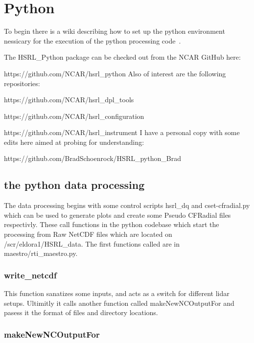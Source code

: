 
\chapter{Python}
\label{SECTION-python}

To begin there is a wiki describing how to set up the python environment nessicary for the execution of the python processing code~\cite{PythonEnvWiki}. 


The HSRL\_Python package can be checked out from the NCAR GitHub here: 

https://github.com/NCAR/hsrl\_python
\newline
\newline
Also of interest are the following repositories: 

https://github.com/NCAR/hsrl\_dpl\_tools

https://github.com/NCAR/hsrl\_configuration

https://github.com/NCAR/hsrl\_instrument
\newline
\newline
I have a personal copy with some edits here aimed at probing for understanding: 

https://github.com/BradSchoenrock/HSRL\_python\_Brad
\newline
\newline

\section{the python data processing}
\label{SECTION-Data-Processing}

The data processing begins with some control scripts hsrl\_dq and cset-cfradial.py which can be used to generate plots and create some Pseudo CFRadial files respectivly. These call functions in the python codebase which start the processing from Raw NetCDF files which are located on /scr/eldora1/HSRL\_data. The first functions called are in maestro/rti\_maestro.py. 

\subsection{write\_netcdf}
\label{SECTION-writenetcdf}

This function sanatizes some inputs, and acts as a switch for different lidar setups. Ultimitly it calls another function called makeNewNCOutputFor and pasess it the format of files and directory locations. 

\subsection{makeNewNCOutputFor}
\label{SECTION-makeNewNCOutputFor}

